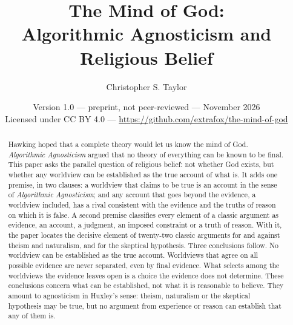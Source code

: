 \documentclass[11pt]{article}
\title{The Mind of God:\\
Algorithmic Agnosticism and Religious Belief}
\author{Christopher S. Taylor}
\date{Version 1.0 --- preprint, not peer-reviewed --- November 2026\\[0.5ex] \small Licensed under CC BY 4.0 --- \url{https://github.com/extrafox/the-mind-of-god}}
\begin{document}
\maketitle

\begin{abstract}
Hawking hoped that a complete theory would let us know the mind of God. \emph{Algorithmic
Agnosticism} argued that no theory of everything can be known to be final. This paper asks the
parallel question of religious belief: not whether God exists, but whether any worldview can be
established as the true account of what is. It adds one premise, in two clauses: a worldview that
claims to be true is an account in the sense of \emph{Algorithmic Agnosticism}; and any account
that goes beyond the evidence, a worldview included, has a rival consistent with the evidence and
the truths of reason on which it is false. A second premise classifies every element of a classic
argument as evidence, an account, a judgment, an imposed constraint or a truth of reason. With it,
the paper locates the decisive element of twenty-two classic arguments for and against theism and
naturalism, and for the skeptical hypothesis. Three conclusions follow. No worldview can be
established as the true account. Worldviews that agree on all possible evidence are never
separated, even by final evidence. What selects among the worldviews the evidence leaves open is a
choice the evidence does not determine. These conclusions concern what can be established, not
what it is reasonable to believe. They amount to agnosticism in Huxley's sense: theism, naturalism
or the skeptical hypothesis may be true, but no argument from experience or reason can establish
that any of them is.
\end{abstract}













\end{document}
